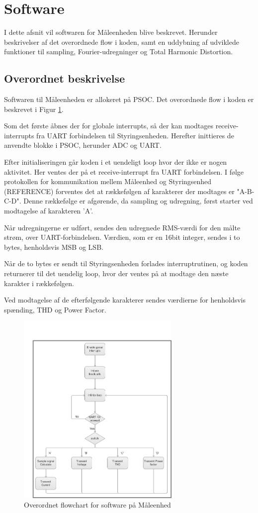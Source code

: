 
\section{Software}

I dette afsnit vil softwaren for Måleenheden blive beskrevet. Herunder beskrivelser af det overordnede flow i koden, samt en uddybning af udviklede funktioner til sampling, Fourier-udregninger og Total Harmonic Distortion. 

\subsection{Overordnet beskrivelse}

Softwaren til Måleenheden er allokeret på PSOC. Det overordnede flow i koden er beskrevet i Figur \ref{fig:MEflowchart}. 

Som det første åbnes der for globale interrupts, så der kan modtages receive-interrupts fra UART forbindelsen til Styringsenheden. Herefter inittieres de anvendte blokke i PSOC, herunder ADC og UART. 

Efter initialiseringen går koden i et uendeligt loop hvor der ikke er nogen aktivitet.  Her ventes der på et receive-interrupt fra UART forbindelsen. I følge protokollen for kommunikation mellem Måleenhed og Styringsenhed (REFERENCE) forventes det at rækkefølgen af karakterer der modtages er "A-B-C-D". Denne rækkefølge er afgørende, da sampling og udregning, først starter ved modtagelse af karakteren 'A'. 

Når udregningerne er udført, sendes den udregnede RMS-værdi for den målte strøm, over UART-forbindelsen. Værdien, som er en 16bit integer, sendes i to bytes, henholdsvis MSB og LSB. 

Når de to bytes er sendt til Styringsenheden forlades interruptrutinen, og koden returnerer til det uendelig loop, hvor der ventes på at modtage den næste karakter i rækkefølgen. 

Ved modtagelse af de efterfølgende karakterer sendes værdierne for henholdsvis spænding, THD og Power Factor. 


\begin{figure}[htbp] %
	\centering
	\includegraphics[width=0.7\textwidth]{Figure/MEflowchart.png}
	\caption{Overordnet flowchart for software på Måleenhed}
	\label{fig:MEflowchart}
\end{figure}

